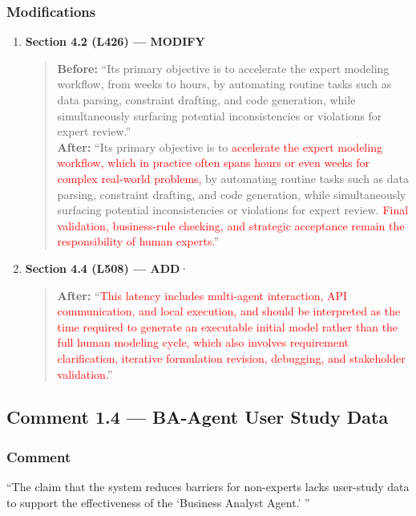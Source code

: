 \documentclass[11pt,a4paper]{article}
\begin{document}
\subsubsection{Modifications}
\begin{enumerate}
\item \textbf{Section 4.2 (L426) --- MODIFY} \label{resp:r1.3-modifications}
\begin{quote}
\textbf{Before:} ``Its primary objective is to accelerate the expert modeling workflow, from weeks to hours, by automating routine tasks such as data parsing, constraint drafting, and code generation, while simultaneously surfacing potential inconsistencies or violations for expert review.''\\[4pt]
\textbf{After:} ``Its primary objective is to \textcolor{red}{accelerate the expert modeling workflow, which in practice often spans hours or even weeks for complex real-world problems,} by automating routine tasks such as data parsing, constraint drafting, and code generation, while simultaneously surfacing potential inconsistencies or violations for expert review. \textcolor{red}{Final validation, business-rule checking, and strategic acceptance remain the responsibility of human experts.}''
\end{quote}

\item \textbf{Section 4.4 (L508) --- ADD}·
\begin{quote}
\textbf{After:} ``\textcolor{red}{This latency includes multi-agent interaction, API communication, and local execution, and should be interpreted as the time required to generate an executable initial model rather than the full human modeling cycle, which also involves requirement clarification, iterative formulation revision, debugging, and stakeholder validation.}''
\end{quote}
\end{enumerate}


\subsection{Comment 1.4 --- BA-Agent User Study Data}\label{subsec:comment1.4}

\subsubsection{Comment}
``The claim that the system reduces barriers for non-experts lacks user-study data to support the effectiveness of the `Business Analyst Agent.' ''
\end{document}
